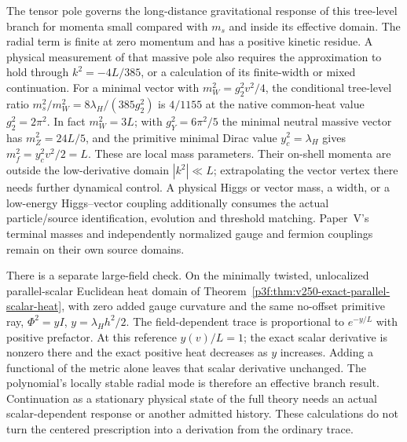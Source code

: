 \documentclass[11pt,a4paper]{article}
\begin{document}
The tensor pole governs the long-distance gravitational response of this
tree-level branch for momenta small compared with \(m_s\) and inside its
effective domain. The radial term is finite at zero momentum and has a
positive kinetic residue. A physical measurement of that massive pole
also requires the approximation to hold through \(k^2=-4L/385\), or
a calculation of its finite-width or mixed continuation. For a minimal
vector with \(m_W^2=g_2^2v^2/4\), the conditional tree-level ratio
\(m_s^2/m_W^2=8\lambda_H/(385g_2^2)\) is \(4/1155\) at the native
common-heat value \(g_2^2=2\pi^2\). In fact \(m_W^2=3L\);
with \(g_Y^2=6\pi^2/5\) the minimal neutral massive vector has
\(m_Z^2=24L/5\), and the primitive minimal Dirac value
\(y_c^2=\lambda_H\) gives \(m_f^2=y_c^2v^2/2=L\).
These are local mass parameters. Their on-shell momenta are outside
the low-derivative domain \(|k^2|\ll L\); extrapolating the vector
vertex there needs further dynamical control. A physical Higgs or vector mass,
a width, or a low-energy Higgs--vector coupling additionally consumes
the actual particle/source identification, evolution and threshold
matching. Paper~V's terminal masses and independently normalized
gauge and fermion couplings remain on their own source domains.

There is a separate large-field check. On the minimally twisted,
unlocalized parallel-scalar Euclidean heat domain of
Theorem~\ref{p3f:thm:v250-exact-parallel-scalar-heat}, with zero
added gauge curvature and the same no-offset primitive ray,
\(\Phi^2=y I\), \(y=\lambda_H h^2/2\).
The field-dependent trace is proportional to \(e^{-y/L}\) with positive
prefactor. At this reference \(y(v)/L=1\); the exact scalar derivative
is nonzero there and the exact positive heat decreases as \(y\) increases.
Adding a functional of the metric alone leaves that scalar derivative
unchanged. The polynomial's locally stable radial mode is therefore an
effective branch result. Continuation as a stationary physical state of
the full theory needs an actual scalar-dependent response or another
admitted history. These calculations do not turn the centered
prescription into a derivation from the ordinary trace.
\end{document}

